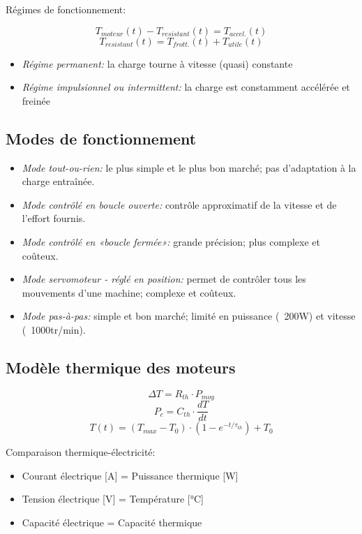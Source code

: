 \documentclass[10pt]{article} %
\begin{document}
\begin{multicols}{3}
\begin{flushleft}
				Régimes de fonctionnement:
				
				\[T_{moteur}(t) - T_{resistant}(t) = T_{accel.}(t) \]
				\[T_{resistant}(t) = T_{frott.}(t) + T_{utile}(t) \]
				
				\begin{itemize}
					\item \emph{Régime permanent:} la charge tourne à vitesse (quasi) constante
					\item \emph{Régime impulsionnel ou intermittent:} la charge est constamment accélérée et freinée
				\end{itemize}
	
			\subsection*{Modes de fonctionnement}
	
				\begin{itemize}
					\item \emph{Mode tout-ou-rien:} le plus simple et le plus bon marché; pas d'adaptation à la charge entraînée.
					\item \emph{Mode contrôlé en boucle ouverte:} contrôle approximatif de la vitesse et de l'effort fournis.
					\item \emph{Mode contrôlé en «boucle fermée»:} grande précision; plus complexe et coûteux.
					\item \emph{Mode servomoteur - réglé en position:} permet de contrôler tous les mouvements d'une machine; complexe et coûteux.
					\item \emph{Mode pas-à-pas:} simple et bon marché; limité en puissance (~200W) et vitesse (~1000tr/min).
				\end{itemize}
	
		
	
			\subsection*{Modèle thermique des moteurs}
	
				\[\Delta T = R_{th} \cdot P_{moy} \]
				\[P_c = C_{th} \cdot \frac{dT}{dt} \]
				\[T(t) = (T_{max} - T_0) \cdot (1 - e^{-t/\tau_{th}}) + T_0 \]

				Comparaison thermique-électricité:
	
				\begin{itemize}
					\item Courant électrique [A] = Puissance thermique [W]
					\item Tension électrique [V] = Température [°C]
					\item Capacité électrique = Capacité thermique
				\end{itemize}
	

\end{flushleft}
\end{multicols}
\end{document}
